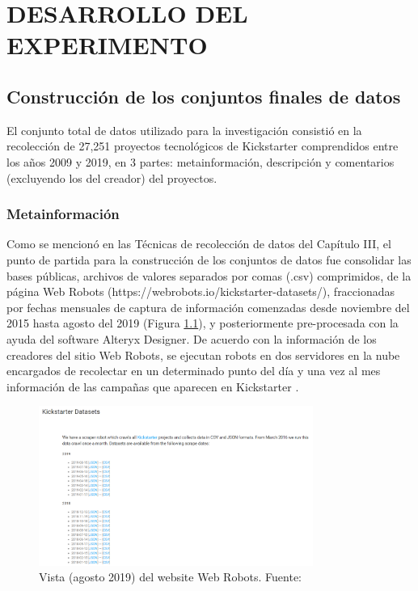 \chapter{DESARROLLO DEL EXPERIMENTO}
\section{Construcción de los conjuntos finales de datos}
El conjunto total de datos utilizado para la investigación consistió en la recolección de 27,251 proyectos tecnológicos de Kickstarter comprendidos entre los años 2009 y 2019, en 3 partes: metainformación, descripción y comentarios (excluyendo los del creador) del proyectos.

\subsection{Metainformación}
Como se mencionó en las Técnicas de recolección de datos del Capítulo III, el punto de partida para la construcción de los conjuntos de datos fue consolidar las bases públicas, archivos de valores separados por comas (.csv) comprimidos, de la página Web Robots (https://webrobots.io/kickstarter-datasets/), fraccionadas por fechas mensuales de captura de información comenzadas desde noviembre del 2015 hasta agosto del 2019 (Figura \ref{4:fig1}), y posteriormente pre-procesada con la ayuda del software Alteryx Designer. De acuerdo con la información de los creadores del sitio Web Robots, se ejecutan robots en dos servidores en la nube encargados de recolectar en un determinado punto del día y una vez al mes información de las campañas que aparecen en Kickstarter \parencite{ot_webrobots2019kickstarter}.

\begin{figure}[!ht]
	\begin{center}
		\includegraphics[width=0.8\textwidth]{4/figures/web_robots_2019.png}
		\caption{Vista (agosto 2019) del website Web Robots. Fuente: \cite{ot_webrobots2019kickstarter}}
		\label{4:fig1}
	\end{center}
\end{figure}

